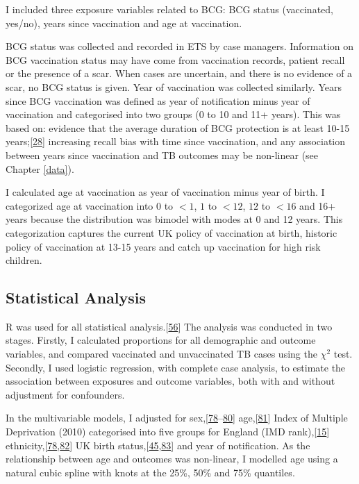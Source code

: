 \documentclass[11pt,twoside]{bristolthesis}
\begin{document}
  I included three exposure variables related to BCG: BCG status (vaccinated, yes/no), years since vaccination and age at vaccination.
  
  BCG status was collected and recorded in ETS by case managers. Information on BCG vaccination status may have come from vaccination records, patient recall or the presence of a scar. When cases are uncertain, and there is no evidence of a scar, no BCG status is given. Year of vaccination was collected similarly. Years since BCG vaccination was defined as year of notification minus year of vaccination and categorised into two groups (0 to 10 and 11+ years). This was based on: evidence that the average duration of BCG protection is at least 10-15 years;{[}\protect\hyperlink{ref-Abubakar2013}{28}{]} increasing recall bias with time since vaccination, and any association between years since vaccination and TB outcomes may be non-linear (see Chapter \ref{data}).
  
  I calculated age at vaccination as year of vaccination minus year of birth. I categorized age at vaccination into \(0\) to \(< 1\), \(1\) to \(< 12\), \(12\) to \(< 16\) and 16+ years because the distribution was bimodel with modes at 0 and 12 years. This categorization captures the current UK policy of vaccination at birth, historic policy of vaccination at 13-15 years and catch up vaccination for high risk children.
  
  \hypertarget{statistical-analysis-1}{%
  \subsection{Statistical Analysis}\label{statistical-analysis-1}}
  
  R was used for all statistical analysis.{[}\protect\hyperlink{ref-R}{56}{]} The analysis was conducted in two stages. Firstly, I calculated proportions for all demographic and outcome variables, and compared vaccinated and unvaccinated TB cases using the \(\chi ^2\) test. Secondly, I used logistic regression, with complete case analysis, to estimate the association between exposures and outcome variables, both with and without adjustment for confounders.
  
  In the multivariable models, I adjusted for sex,{[}\protect\hyperlink{ref-Parslow2001}{78}--\protect\hyperlink{ref-Aaby2014}{80}{]} age,{[}\protect\hyperlink{ref-Teale1993}{81}{]} Index of Multiple Deprivation (2010) categorised into five groups for England (IMD rank),{[}\protect\hyperlink{ref-Bhatti1995}{15}{]} ethnicity,{[}\protect\hyperlink{ref-Parslow2001}{78},\protect\hyperlink{ref-Abubakar2008}{82}{]} UK birth status,{[}\protect\hyperlink{ref-French2007}{45},\protect\hyperlink{ref-Djuretic2002}{83}{]} and year of notification. As the relationship between age and outcomes was non-linear, I modelled age using a natural cubic spline with knots at the 25\%, 50\% and 75\% quantiles.
  
\end{document}

